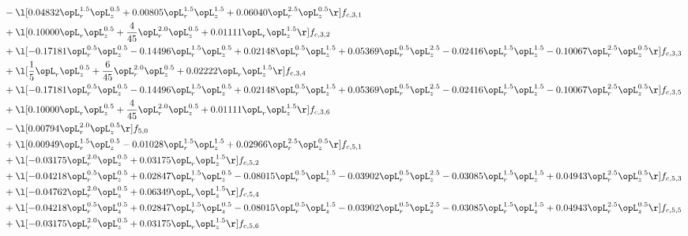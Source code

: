 \begin{alignat}{2}
& - \l[  0.04832 \opL_r^{1.5} \opL_z^{0.5} +  0.00805 \opL_r^{1.5} \opL_z^{1.5} +  0.06040 \opL_r^{2.5} \opL_z^{0.5}  \r] f_{c,3,1} \nonumber \\ 
& + \l[  0.10000 \opL_r \opL_z^{0.5} + \frac{4}{45} \opL_r^{2.0} \opL_z^{0.5} +  0.01111 \opL_r \opL_z^{1.5}  \r] f_{c,3,2} \nonumber \\ 
& + \l[  -0.17181 \opL_r^{0.5} \opL_z^{0.5}   -0.14496 \opL_r^{1.5} \opL_z^{0.5} +  0.02148 \opL_r^{0.5} \opL_z^{1.5} +  0.05369 \opL_r^{0.5} \opL_z^{2.5}   -0.02416 \opL_r^{1.5} \opL_z^{1.5}   -0.10067 \opL_r^{2.5} \opL_z^{0.5}  \r] f_{c,3,3} \nonumber \\ 
& + \l[ \frac{1}{5} \opL_r \opL_z^{0.5} + \frac{6}{45} \opL_r^{2.0} \opL_z^{0.5} +  0.02222 \opL_r \opL_z^{1.5}  \r] f_{c,3,4} \nonumber \\ 
& + \l[  -0.17181 \opL_r^{0.5} \opL_z^{0.5}   -0.14496 \opL_r^{1.5} \opL_z^{0.5} +  0.02148 \opL_r^{0.5} \opL_z^{1.5} +  0.05369 \opL_r^{0.5} \opL_z^{2.5}   -0.02416 \opL_r^{1.5} \opL_z^{1.5}   -0.10067 \opL_r^{2.5} \opL_z^{0.5}  \r] f_{c,3,5} \nonumber \\ 
& + \l[  0.10000 \opL_r \opL_z^{0.5} + \frac{4}{45} \opL_r^{2.0} \opL_z^{0.5} +  0.01111 \opL_r \opL_z^{1.5}  \r] f_{c,3,6} \nonumber \\ 
& - \l[  0.00794 \opL_r^{2.0} \opL_z^{0.5}  \r] f_{5,0} \nonumber \\ 
& + \l[  0.00949 \opL_r^{1.5} \opL_z^{0.5}   -0.01028 \opL_r^{1.5} \opL_z^{1.5} +  0.02966 \opL_r^{2.5} \opL_z^{0.5}  \r] f_{c,5,1} \nonumber \\ 
& + \l[  -0.03175 \opL_r^{2.0} \opL_z^{0.5} +  0.03175 \opL_r \opL_z^{1.5}  \r] f_{c,5,2} \nonumber \\ 
& + \l[  -0.04218 \opL_r^{0.5} \opL_z^{0.5} +  0.02847 \opL_r^{1.5} \opL_z^{0.5}   -0.08015 \opL_r^{0.5} \opL_z^{1.5}   -0.03902 \opL_r^{0.5} \opL_z^{2.5}   -0.03085 \opL_r^{1.5} \opL_z^{1.5} +  0.04943 \opL_r^{2.5} \opL_z^{0.5}  \r] f_{c,5,3} \nonumber \\ 
& + \l[  -0.04762 \opL_r^{2.0} \opL_z^{0.5} +  0.06349 \opL_r \opL_z^{1.5}  \r] f_{c,5,4} \nonumber \\ 
& + \l[  -0.04218 \opL_r^{0.5} \opL_z^{0.5} +  0.02847 \opL_r^{1.5} \opL_z^{0.5}   -0.08015 \opL_r^{0.5} \opL_z^{1.5}   -0.03902 \opL_r^{0.5} \opL_z^{2.5}   -0.03085 \opL_r^{1.5} \opL_z^{1.5} +  0.04943 \opL_r^{2.5} \opL_z^{0.5}  \r] f_{c,5,5} \nonumber \\ 
& + \l[  -0.03175 \opL_r^{2.0} \opL_z^{0.5} +  0.03175 \opL_r \opL_z^{1.5}  \r] f_{c,5,6} \nonumber \\ 

\end{alignat}
